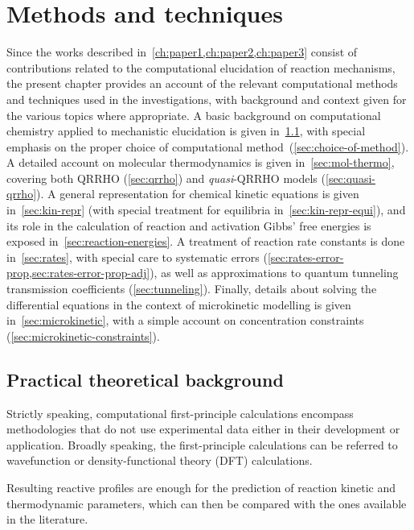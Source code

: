 \chapter{Methods and techniques}%
\label{ch:methods}

Since the works described in~\cref{ch:paper1,ch:paper2,ch:paper3} consist
of contributions related to the computational elucidation of reaction mechanisms,
the present chapter provides an account of the relevant computational methods and
techniques used in the investigations,
with background and context given
for the various topics where appropriate.
A basic background on computational chemistry applied
to mechanistic elucidation is given in~\cref{sec:background-methods},
with special emphasis on the proper choice of computational method~(\cref{sec:choice-of-method}).
A detailed account on molecular thermodynamics is given in~\cref{sec:mol-thermo},
covering both QRRHO (\cref{sec:qrrho}) and \emph{quasi}-QRRHO models (\cref{sec:quasi-qrrho}).
A general representation for chemical kinetic equations is given in~\cref{sec:kin-repr}
(with special treatment for equilibria in~\cref{sec:kin-repr-equi}),
and its role in the calculation of reaction and activation Gibbs' free energies is
exposed in~\cref{sec:reaction-energies}.
A treatment of reaction rate constants is done in~\cref{sec:rates},
with special care to systematic errors (\cref{sec:rates-error-prop,sec:rates-error-prop-adj}),
as well as approximations to quantum tunneling transmission coefficients (\cref{sec:tunneling}).
Finally, details about solving the differential equations
in the context of microkinetic modelling is given in~\cref{sec:microkinetic},
with a simple account on concentration constraints (\cref{sec:microkinetic-constraints}).

\section{Practical theoretical background}%
\label{sec:background-methods}

Strictly speaking,
computational first-principle calculations encompass
methodologies that do not use experimental data either in their development or
application.
Broadly speaking,
the first-principle calculations can be referred to
wavefunction or density-functional theory (DFT) calculations.

Resulting reactive profiles are enough for the prediction of reaction kinetic and thermodynamic parameters,
which can then be compared with the ones available in the literature.

